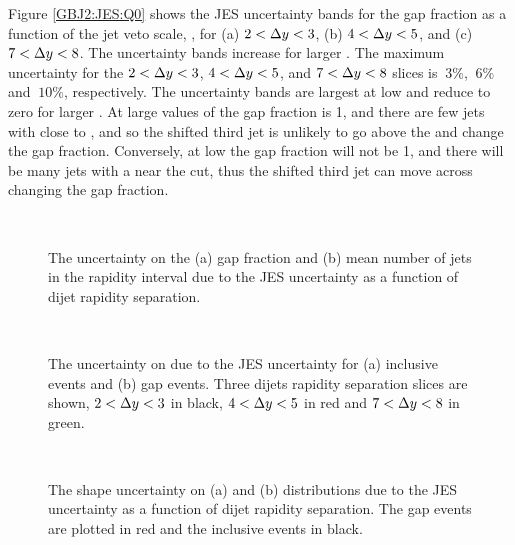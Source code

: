 Figure \ref{GBJ2:JES:Q0} shows the JES uncertainty bands for the gap fraction as a function of the jet veto scale, \qz{}, for (a) $2<\mbox{$\Delta y$}{}<3$, (b) $4<\mbox{$\Delta y$}{}<5$, and (c) $7<\mbox{$\Delta y$}{}<8$.
The uncertainty bands increase for larger \dy{}.
The maximum uncertainty for the $2<\mbox{$\Delta y$}{}<3$,  $4<\mbox{$\Delta y$}{}<5$, and  $7<\mbox{$\Delta y$}{}<8$ slices is $~3\%$, $~6\%$ and $~10\%$, respectively.
The uncertainty bands are largest at low \qz{} and reduce to zero for larger \qz{}.
At large values of \qz{} the gap fraction is 1, and there are few jets with \pt{} close to \qz{}, and so the shifted third jet is unlikely to go above the \qz{} and change the gap fraction.
Conversely, at low \qz{} the gap fraction will not be 1, and there will be many jets with a \pt{} near the \qz{} cut, thus the shifted third jet \pt{}  can move across \qz{} changing the gap fraction.


\begin{figure}
\centering
\mbox{
              \quad
              \quad
                              }
\caption[Uncertainty bands due to the JES uncertainty for gap fraction and mean number of jets]{
The uncertainty on the (a) gap fraction and (b) mean number of jets in the rapidity interval due to the JES uncertainty as a function of dijet rapidity separation. 
\label{GBJ2:JES:gap_njets}}
\end{figure}



\begin{figure}
\centering
\mbox{
              \quad
              \quad
                              }
\caption[Uncertainty bands due to the JES uncertainty for \dphiDist{}]{
The uncertainty on \dphiDist{} due to the JES uncertainty for (a) inclusive events and (b) gap events. 
Three dijets rapidity separation slices are shown, $2<\mbox{$\Delta y$}{}<3$ in black, $4<\mbox{$\Delta y$}{}<5$ in red and $7<\mbox{$\Delta y$}{}<8$ in green.
\label{GBJ2:JES:dPhi}}
\end{figure}


\begin{figure}
\centering
\mbox{
              \quad
              \quad
                              }
\caption[Uncertainty bands due to the JES uncertainty for \mean{\cosdphi{}} and  \mean{\costwodphi{}}]{
The shape uncertainty on (a) \mean{\cosdphi{}} and (b) \mean{\costwodphi{}} distributions due to the JES uncertainty as a function of dijet rapidity separation.
The gap events are plotted in red and the inclusive events in black.
\label{GBJ2:JES:cos}}
\end{figure}


